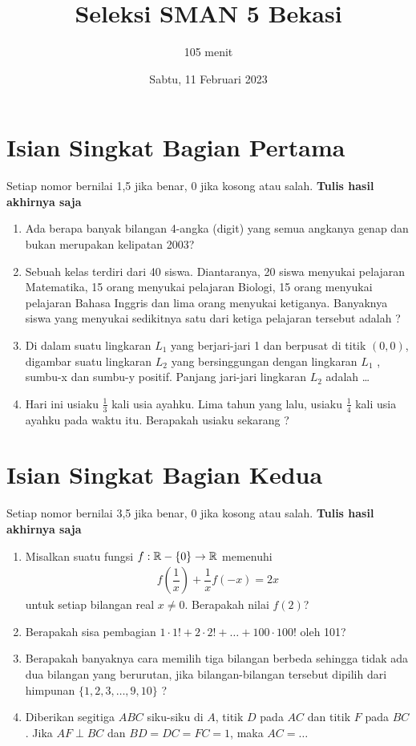 \documentclass[12pt]{scrartcl}
\title{Seleksi SMAN 5 Bekasi}
\author{105 menit}
\date{Sabtu, 11 Februari 2023}
\begin{document}
\maketitle

\renewcommand*\contentsname{Daftar Isi}
\tableofcontents

\newpage
\section{Isian Singkat Bagian Pertama}
Setiap nomor bernilai 1,5 jika benar, 0 jika kosong atau salah. \textbf{Tulis hasil akhirnya saja}
\begin{enumerate}
\item Ada berapa banyak bilangan 4-angka (digit) yang semua angkanya genap dan bukan merupakan kelipatan 2003?

\item Sebuah kelas terdiri dari 40 siswa. Diantaranya, 20 siswa menyukai pelajaran Matematika, 15 orang menyukai pelajaran Biologi, 15 orang menyukai pelajaran Bahasa Inggris dan lima orang menyukai ketiganya. Banyaknya siswa yang menyukai sedikitnya satu dari ketiga pelajaran tersebut adalah ?

\item Di dalam suatu lingkaran $L_1$ yang berjari-jari 1 dan berpusat di titik $(0,0)$, digambar suatu lingkaran $L_2$ yang bersinggungan dengan lingkaran $L_1$ , sumbu-x dan sumbu-y positif. Panjang jari-jari
lingkaran $L_2$ adalah \dots

\item Hari ini usiaku $\tfrac{1}{3}$ kali usia ayahku. Lima tahun yang lalu, usiaku $\tfrac{1}{4}$ kali usia ayahku pada waktu itu. Berapakah usiaku sekarang ?
\end{enumerate}

\newpage
\section{Isian Singkat Bagian Kedua}
Setiap nomor bernilai 3,5 jika benar, 0 jika kosong atau salah. \textbf{Tulis hasil akhirnya saja}

\begin{enumerate}
    \item Misalkan suatu fungsi $f: \mathbb R-\{0\} \to \mathbb R$ memenuhi
\begin{align*}
    f\left(\dfrac{1}{x}\right)+\dfrac{1}{x}f\left(-x\right)=2x
\end{align*}
untuk setiap bilangan real $x \neq 0$. Berapakah nilai $f(2)$? 

    \item Berapakah sisa pembagian $1\cdot 1!+2 \cdot 2! + \dots + 100 \cdot 100!$ oleh 101?

    \item Berapakah banyaknya cara memilih tiga bilangan berbeda sehingga tidak ada dua bilangan yang berurutan, jika bilangan-bilangan tersebut dipilih dari himpunan $\{1, 2, 3,\dots, 9, 10 \}$ ?

    \item Diberikan segitiga $ABC$ siku-siku di $A$, titik $D$ pada $AC$ dan titik $F$ pada $BC$. Jika $AF \perp BC$ dan $BD=DC=FC=1$, maka $AC= \dots$
\end{enumerate}
\end{document}
